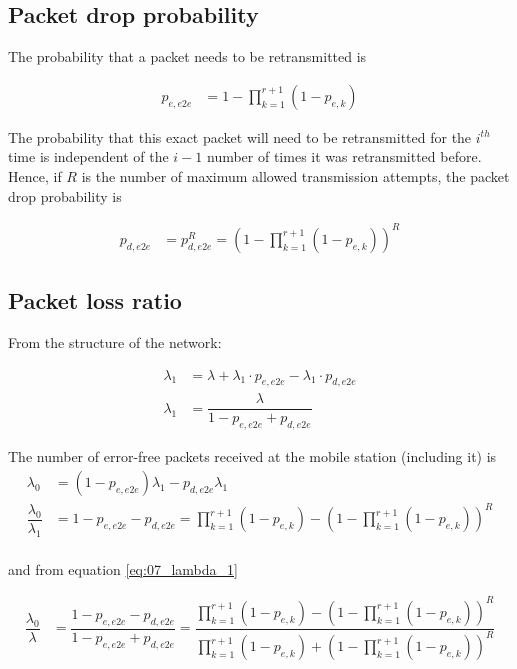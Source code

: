 \subsection{Packet drop probability}

The probability that a packet needs to be retransmitted is

\begin{align*}
  p_{e,e2e} &= 1 - \prod_{k=1}^{r+1} (1 - p_{e,k})
\end{align*}

The probability that this exact packet will need to be retransmitted for the
$i^{th}$ time is independent of the $i-1$ number of times it was retransmitted
before. Hence, if $R$ is the number of maximum allowed transmission
attempts, the packet drop probability is

\begin{align*}
  p_{d,e2e} &= p_{d,e2e}^R = (1 - \prod_{k=1}^{r+1} (1 - p_{e,k}))^R
\end{align*}


\subsection{Packet loss ratio}

From the structure of the network:

\begin{align}
  \lambda_1 &= \lambda + \lambda_1 \cdot p_{e,e2e} - \lambda_1 \cdot p_{d,e2e} \nonumber \\
  \lambda_1 &= \dfrac{\lambda}{1 - p_{e,e2e} + p_{d,e2e}} \label{eq:07_lambda_1}
\end{align}

The number of error-free packets received at the mobile station (including it)
is
\begin{align*}
  \lambda_0 &= (1 - p_{e,e2e}) \lambda_1 - p_{d,e2e} \lambda_1 \\
  \dfrac{\lambda_0}{\lambda_1} &= 1 - p_{e,e2e} - p_{d,e2e} =
  \prod_{k=1}^{r+1} (1 - p_{e,k}) - (1 - \prod_{k=1}^{r+1} (1 - p_{e,k}))^R\\
\end{align*}

and from equation \ref{eq:07_lambda_1}

\begin{align*}
  \dfrac{\lambda_0}{\lambda} &= \dfrac{1 - p_{e,e2e} - p_{d,e2e}}{1 - p_{e,e2e} + p_{d,e2e}} =
  \dfrac{\prod\limits_{k=1}^{r+1} (1 - p_{e,k}) - (1 - \prod\limits_{k=1}^{r+1} (1 - p_{e,k}))^R}
        {\prod\limits_{k=1}^{r+1} (1 - p_{e,k}) + (1 - \prod\limits_{k=1}^{r+1} (1 - p_{e,k}))^R}
\end{align*}

